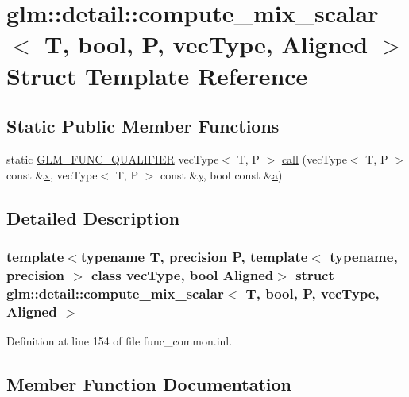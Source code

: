 \hypertarget{structglm_1_1detail_1_1compute__mix__scalar_3_01_t_00_01bool_00_01_p_00_01vec_type_00_01_aligned_01_4}{}\section{glm\+::detail\+::compute\+\_\+mix\+\_\+scalar$<$ T, bool, P, vec\+Type, Aligned $>$ Struct Template Reference}
\label{structglm_1_1detail_1_1compute__mix__scalar_3_01_t_00_01bool_00_01_p_00_01vec_type_00_01_aligned_01_4}
\subsection*{Static Public Member Functions}
\begin{DoxyCompactItemize}
\item 
static \mbox{\hyperlink{setup_8hpp_a33fdea6f91c5f834105f7415e2a64407}{G\+L\+M\+\_\+\+F\+U\+N\+C\+\_\+\+Q\+U\+A\+L\+I\+F\+I\+ER}} vec\+Type$<$ T, P $>$ \mbox{\hyperlink{structglm_1_1detail_1_1compute__mix__scalar_3_01_t_00_01bool_00_01_p_00_01vec_type_00_01_aligned_01_4_a01419cd163f931e46a5b71d9ec7d40cb}{call}} (vec\+Type$<$ T, P $>$ const \&\mbox{\hyperlink{glad_8h_a92d0386e5c19fb81ea88c9f99644ab1d}{x}}, vec\+Type$<$ T, P $>$ const \&\mbox{\hyperlink{glad_8h_a66ddd433d2cacfe27f5906b7e86faeed}{y}}, bool const \&\mbox{\hyperlink{glad_8h_ac8729153468b5dcf13f971b21d84d4e5}{a}})
\end{DoxyCompactItemize}


\subsection{Detailed Description}
\subsubsection*{template$<$typename T, precision P, template$<$ typename, precision $>$ class vec\+Type, bool Aligned$>$\newline
struct glm\+::detail\+::compute\+\_\+mix\+\_\+scalar$<$ T, bool, P, vec\+Type, Aligned $>$}



Definition at line 154 of file func\+\_\+common.\+inl.



\subsection{Member Function Documentation}
\mbox{\label{structglm_1_1detail_1_1compute__mix__scalar_3_01_t_00_01bool_00_01_p_00_01vec_type_00_01_aligned_01_4_a01419cd163f931e46a5b71d9ec7d40cb}} 
